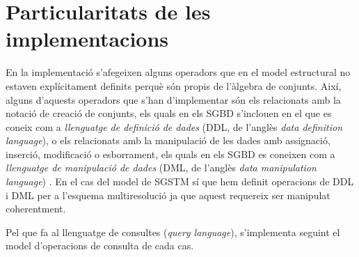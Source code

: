 \section{Particularitats de les implementacions}


En la implementació s'afegeixen alguns operadors que en el model
estructural no estaven explícitament definits perquè són propis de
l'àlgebra de conjunts. Així, alguns d'aquests operadors que s'han
d'implementar són els relacionats amb la notació de creació de
conjunts, %
els quals en els \gls{SGBD} s'inclouen en el que es coneix com a
\emph{llenguatge de definició de dades} (DDL, de l'anglès \emph{data
  definition language}), o els relacionats amb la manipulació de les
dades amb assignació, inserció, modificació o esborrament, els quals
en els SGBD es coneixen com a \emph{llenguatge de manipulació de
  dades} (DML, de l'anglès \emph{data manipulation language}) .  En el
cas del model de \gls{SGSTM} sí que hem definit operacions de DDL i DML per
a l'esquema multiresolució ja que aquest requereix ser manipulat
coherentment.

Pel que fa al llenguatge de consultes (\emph{query language}),
s'implementa seguint el model d'operacions de consulta de cada cas.













